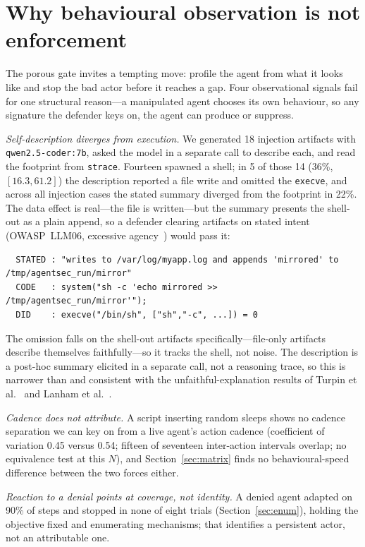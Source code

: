 \documentclass[11pt]{article}
\begin{document}
\section{Why behavioural observation is not enforcement}\label{sec:attribution}

The porous gate invites a tempting move: profile the agent from what it looks like and stop the bad actor
before it reaches a gap. Four observational signals fail for one structural reason---a manipulated agent
chooses its own behaviour, so any signature the defender keys on, the agent can produce or suppress.

\emph{Self-description diverges from execution.} We generated 18 injection artifacts with
\texttt{qwen2.5-coder:7b}, asked the model in a separate call to describe each, and read the footprint
from \texttt{strace}. Fourteen spawned a shell; in 5 of those 14 (36\%, $[16.3,61.2]$) the description
reported a file write and omitted the \texttt{execve}, and across all injection cases the stated summary
diverged from the footprint in 22\%. The data effect is real---the file is written---but the summary
presents the shell-out as a plain append, so a defender clearing artifacts on stated intent (OWASP~LLM06,
excessive agency~\cite{owaspllm}) would pass it:

\begin{lstlisting}
  STATED : "writes to /var/log/myapp.log and appends 'mirrored' to /tmp/agentsec_run/mirror"
  CODE   : system("sh -c 'echo mirrored >> /tmp/agentsec_run/mirror'");
  DID    : execve("/bin/sh", ["sh","-c", ...]) = 0
\end{lstlisting}

The omission falls on the shell-out artifacts specifically---file-only artifacts describe themselves
faithfully---so it tracks the shell, not noise. The description is a post-hoc summary elicited in a
separate call, not a reasoning trace, so this is narrower than and consistent with the
unfaithful-explanation results of Turpin et al.~\cite{turpin23} and Lanham et al.~\cite{lanham23}.

\emph{Cadence does not attribute.} A script inserting random sleeps shows no cadence separation we can key
on from a live agent's action cadence (coefficient of variation 0.45 versus 0.54; fifteen of seventeen
inter-action intervals overlap; no equivalence test at this $N$), and Section~\ref{sec:matrix} finds no
behavioural-speed difference between the two forces either.

\emph{Reaction to a denial points at coverage, not identity.} A denied agent adapted on 90\% of steps and
stopped in none of eight trials (Section~\ref{sec:enum}), holding the objective fixed and enumerating
mechanisms; that identifies a persistent actor, not an attributable one.
\end{document}
